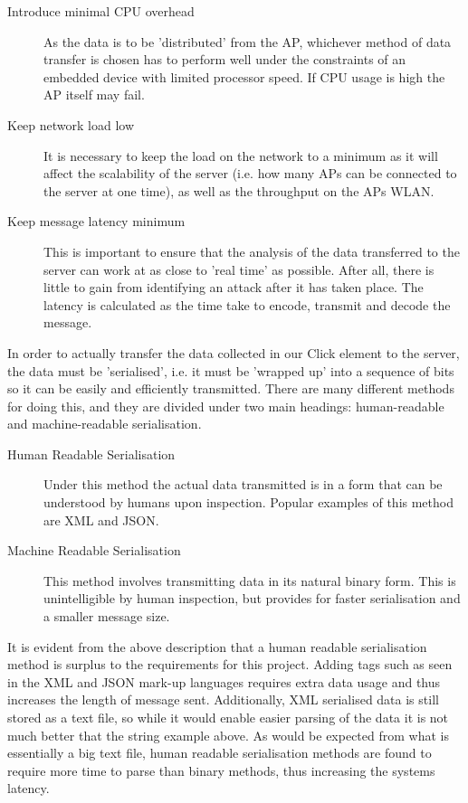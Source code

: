     \begin{description}
      \item[Introduce minimal CPU overhead] As the data is to be 'distributed' from the AP, whichever method of data transfer is chosen has to perform well under the constraints of an embedded device with limited processor speed. If CPU usage is high the AP itself may fail.
      \item[Keep network load low] It is necessary to keep the load on the network to a minimum as it will affect the scalability of the server (i.e. how many APs can be connected to the server at one time), as well as the throughput on the APs WLAN.
      \item[Keep message latency minimum] This is important to ensure that the analysis of the data transferred to the server can work at as close to 'real time' as possible. After all, there is little to gain from identifying an attack after it has taken place. The latency is calculated as the time take to encode, transmit and decode the message.
    \end{description}

    In order to actually transfer the data collected in our Click element to the server, the data must be 'serialised', i.e. it must be 'wrapped up' into a sequence of bits so it can be easily and efficiently transmitted. There are many different methods for doing this, and they are divided under two main headings: human-readable and machine-readable serialisation.

    \begin{description}
      \item[Human Readable Serialisation] Under this method the actual data transmitted is in a form that can be understood by humans upon inspection. Popular examples of this method are XML and JSON.
      \item[Machine Readable Serialisation] This method involves transmitting data in its natural binary form. This is unintelligible by human inspection, but provides for faster serialisation and a smaller message size.
    \end{description}

    It is evident from the above description that a human readable serialisation method is surplus to the requirements for this project. Adding tags such as seen in the XML and JSON mark-up languages requires extra data usage and thus increases the length of message sent. Additionally, XML serialised data is still stored as a text file, so while it would enable easier parsing of the data it is not much better that the string example above. As would be expected from what is essentially a big text file, human readable serialisation methods are found to require more time to parse than binary methods, thus increasing the systems latency.\cite{MC}

